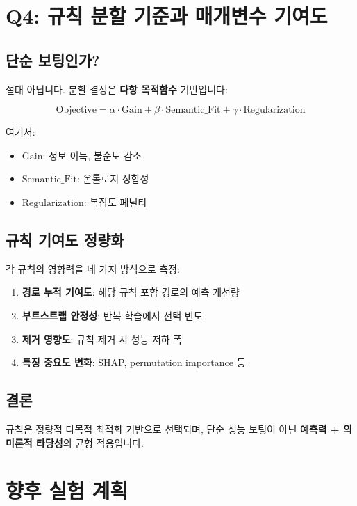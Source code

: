 \documentclass[11pt, twocolumn]{article}
\begin{document}
\section{Q4: 규칙 분할 기준과 매개변수 기여도}

\subsection{단순 보팅인가?}

절대 아닙니다. 분할 결정은 \textbf{다항 목적함수} 기반입니다:

\[
\text{Objective} = \alpha \cdot \text{Gain} + \beta \cdot \text{Semantic\_Fit} + \gamma \cdot \text{Regularization}
\]

여기서:
\begin{itemize}
    \item $\text{Gain}$: 정보 이득, 불순도 감소
    \item $\text{Semantic\_Fit}$: 온톨로지 정합성
    \item $\text{Regularization}$: 복잡도 페널티
\end{itemize}

\subsection{규칙 기여도 정량화}

각 규칙의 영향력을 네 가지 방식으로 측정:

\begin{enumerate}
    \item \textbf{경로 누적 기여도}: 해당 규칙 포함 경로의 예측 개선량
    \item \textbf{부트스트랩 안정성}: 반복 학습에서 선택 빈도
    \item \textbf{제거 영향도}: 규칙 제거 시 성능 저하 폭
    \item \textbf{특징 중요도 변화}: SHAP, permutation importance 등
\end{enumerate}

\subsection{결론}

규칙은 정량적 다목적 최적화 기반으로 선택되며, 단순 성능 보팅이 아닌 
\textbf{예측력 + 의미론적 타당성}의 균형 적용입니다.

\section{향후 실험 계획}
\end{document}

